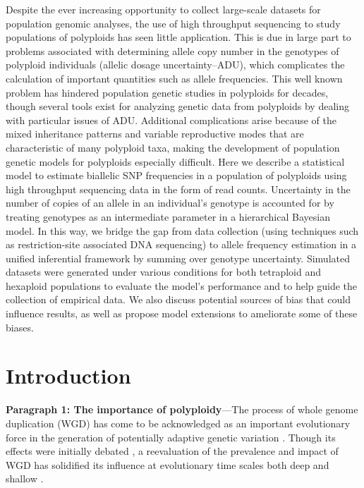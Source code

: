 \documentclass[11pt,english,letterpaper,oneside]{article}
\begin{document}
Despite the ever increasing opportunity to collect large-scale datasets for population genomic analyses, the use of high throughput sequencing to study populations of polyploids has seen little application. This is due in large part to problems associated with determining allele copy number in the genotypes of polyploid individuals (allelic dosage uncertainty--ADU), which complicates the calculation of important quantities such as allele frequencies. This well known problem has hindered population genetic studies in polyploids for decades, though several tools exist for analyzing genetic data from polyploids by dealing with particular issues of ADU. Additional complications arise because of the mixed inheritance patterns and variable reproductive modes that are characteristic of many polyploid taxa, making the development of population genetic models for polyploids especially difficult. Here we describe a statistical model to estimate biallelic SNP frequencies in a population of polyploids using high throughput sequencing data in the form of read counts. Uncertainty in the number of copies of an allele in an individual's genotype is accounted for by treating genotypes as an intermediate parameter in a hierarchical Bayesian model. In this way, we bridge the gap from data collection (using techniques such as restriction-site associated DNA sequencing) to allele frequency estimation in a unified inferential framework by summing over genotype uncertainty. Simulated datasets were generated under various conditions for both tetraploid and hexaploid populations to evaluate the model's performance and to help guide the collection of empirical data. We also discuss potential sources of bias that could influence results, as well as propose model extensions to ameliorate some of these biases.
\medskip

\section*{Introduction}            %

\textbf{Paragraph 1: The importance of polyploidy}---The process of whole genome duplication (WGD) has come to be acknowledged as an important evolutionary force in the generation of potentially adaptive genetic variation \citep{otto2000polyploidy,soltis2000PNASployploidy,soltisD2003polyploid,soltisd2009diversification,soltisd2010polyploidUnknowns,soltisd2014stebbins,Selmecki2015yeastAdaptation}. Though its effects were initially debated \citep{wagner1970noise,StebbinsVariationEvolution}, a reevaluation of the prevalence and impact of WGD has solidified its influence at evolutionary time scales both deep and shallow \citep{soltisd2004tragopogon,comai2005polyploid,cui2006genomeDuplication,jiao2011ancientWGD,canon2014polyploidyLegumes,douglas2015diploidizationCapsella}. 
\medskip
\end{document}
